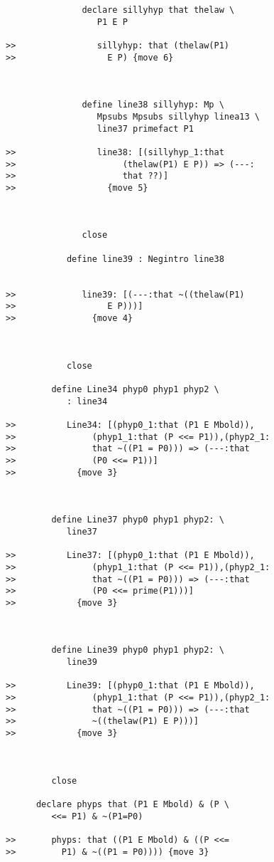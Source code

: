 \documentclass[12pt]{article}
\begin{document}
\begin{verbatim}
               declare sillyhyp that thelaw \
                  P1 E P

>>                sillyhyp: that (thelaw(P1)
>>                  E P) {move 6}



               define line38 sillyhyp: Mp \
                  Mpsubs Mpsubs sillyhyp linea13 \
                  line37 primefact P1

>>                line38: [(sillyhyp_1:that
>>                     (thelaw(P1) E P)) => (---:
>>                     that ??)]
>>                  {move 5}



               close

            define line39 : Negintro line38


>>             line39: [(---:that ~((thelaw(P1)
>>                  E P)))]
>>               {move 4}



            close

         define Line34 phyp0 phyp1 phyp2 \
            : line34

>>          Line34: [(phyp0_1:that (P1 E Mbold)),
>>               (phyp1_1:that (P <<= P1)),(phyp2_1:
>>               that ~((P1 = P0))) => (---:that
>>               (P0 <<= P1))]
>>            {move 3}



         define Line37 phyp0 phyp1 phyp2: \
            line37

>>          Line37: [(phyp0_1:that (P1 E Mbold)),
>>               (phyp1_1:that (P <<= P1)),(phyp2_1:
>>               that ~((P1 = P0))) => (---:that
>>               (P0 <<= prime(P1)))]
>>            {move 3}



         define Line39 phyp0 phyp1 phyp2: \
            line39

>>          Line39: [(phyp0_1:that (P1 E Mbold)),
>>               (phyp1_1:that (P <<= P1)),(phyp2_1:
>>               that ~((P1 = P0))) => (---:that
>>               ~((thelaw(P1) E P)))]
>>            {move 3}



         close

      declare phyps that (P1 E Mbold) & (P \
         <<= P1) & ~(P1=P0)

>>       phyps: that ((P1 E Mbold) & ((P <<=
>>         P1) & ~((P1 = P0)))) {move 3}




\end{verbatim}
\end{document}
